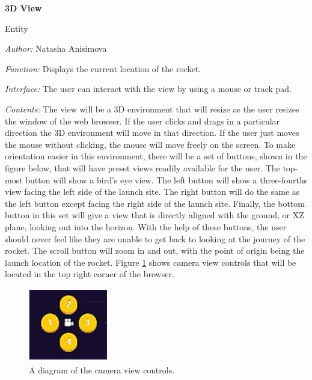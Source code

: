 \documentclass[10pt,draftclsnofoot,onecolumn]{IEEEtran}
\newcommand{\newinterface}[5]{

		\noindent\textbf{#2}
		
		\noindent Entity
		
		\noindent\textit{Author:} {#1}
		
		\noindent\textit{Function:} {#3}
		
		\noindent\textit{Interface:} {#4}		

		\noindent\textit{Contents:} {#5}
		\vspace{.5cm}
}
\begin{document}
	\newinterface
	{Natasha Anisimova}
	{3D View}
	{Displays the current location of the rocket.}
	{The user can interact with the view by using a mouse or track pad.}
	{
		The view will be a 3D environment that will resize as the user
		resizes the window of the web browser. If the user clicks and drags in a particular direction
		the 3D environment will move in that direction. If the user just moves the mouse without clicking, the mouse will move freely on the screen. To make orientation easier in this environment, there will be a set of buttons, shown in the figure below, that will have preset views readily available for the user. The top-most button will show a bird's eye view. The left button will show a three-fourths view facing the left side of the launch site. The right button will do the same as the left button except facing the right side of the launch site. Finally, the bottom button in this set will give a view that is directly aligned with the ground, or XZ plane, looking out into the horizon. With the help of these buttons, the user should never feel like they are unable to get back to looking at the journey of the rocket. The scroll button will zoom in and out, with the point of origin being the launch location of the rocket. Figure \ref{fig:1} shows camera view controls that will be located in the top right corner of the browser.
	}
	\begin{center}
	\begin{figure}[htbp!]
		\centering\includegraphics[width=3.5cm]{cameracontrols.eps}
		\caption{A diagram of the camera view controls.}
		\label{fig:1}
	\end{figure}
	\end{center}
\end{document}
